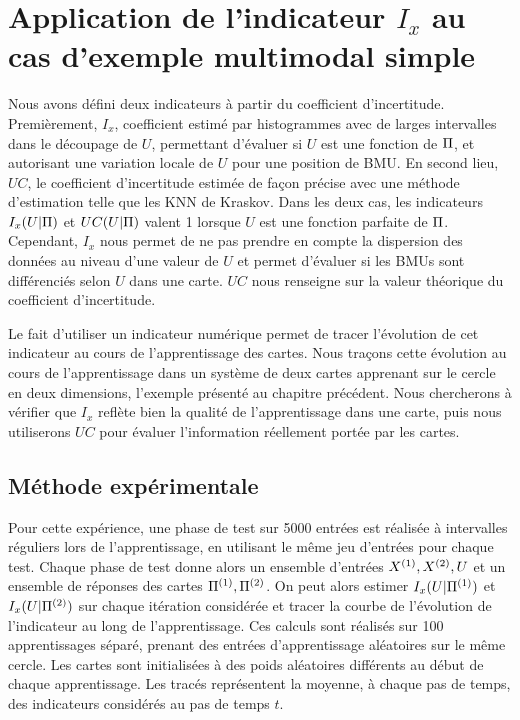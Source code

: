 \section{Application de l'indicateur $I_x$ au cas d'exemple multimodal simple}

Nous avons défini deux indicateurs à partir du coefficient d'incertitude. Premièrement, $I_x$, coefficient estimé par histogrammes avec de larges intervalles dans le découpage de $U$, permettant d'évaluer si $U$ est une fonction de $\Pi$, et autorisant une variation locale de $U$ pour une position de BMU.
En second lieu, $UC$, le coefficient d'incertitude estimée de façon précise avec une méthode d'estimation telle que les KNN de Kraskov.
Dans les deux cas, les indicateurs $I_x(U|\Pi)$ et $UC(U|\Pi)$ valent 1 lorsque $U$ est une fonction parfaite de $\Pi$. Cependant, $I_x$ nous permet de ne pas prendre en compte la dispersion des données au niveau d'une valeur de $U$ et permet d'évaluer si les BMUs sont différenciés selon $U$ dans une carte. 
$UC$ nous renseigne sur la valeur théorique du coefficient d'incertitude.

Le fait d'utiliser un indicateur numérique permet de tracer l'évolution de cet indicateur au cours de l'apprentissage des cartes.
Nous traçons cette évolution au cours de l'apprentissage dans un système de deux cartes apprenant sur le cercle en deux dimensions, l'exemple présenté au chapitre précédent.
Nous chercherons à vérifier que $I_x$ reflète bien la qualité de l'apprentissage dans une carte, puis nous utiliserons $UC$ pour évaluer l'information réellement portée par les cartes.

\subsection{Méthode expérimentale}

Pour cette expérience, une phase de test sur 5000 entrées est réalisée à intervalles réguliers lors de l'apprentissage, en utilisant le même jeu d'entrées pour chaque test. Chaque phase de test donne alors un ensemble d'entrées $X^{({1})}, X^{({2})}, U$ et un ensemble de réponses des cartes $\Pi^{({1})}, \Pi^{({2})}$. On peut alors estimer $I_x(U|\Pi^{({1})})$ et $I_x(U|\Pi^{({2})})$ sur chaque itération considérée et tracer la courbe de l'évolution de l'indicateur au long de l'apprentissage. 
Ces calculs sont réalisés sur 100 apprentissages séparé, prenant des entrées d'apprentissage aléatoires sur le même cercle. Les cartes sont initialisées à des poids aléatoires différents au début de chaque apprentissage. 
Les tracés représentent la moyenne, à chaque pas de temps, des indicateurs considérés au pas de temps $t$.

